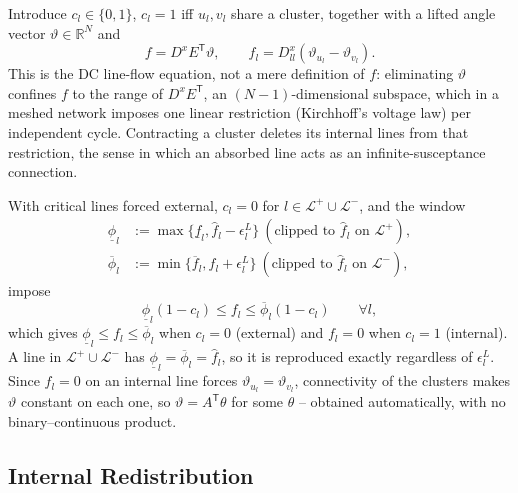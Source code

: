 \documentclass[journal]{IEEEtran}
\newcommand{\R}{\mathbb{R}}
\begin{document}
Introduce $c_l\in\{0,1\}$, $c_l=1$ iff $u_l,v_l$ share a cluster, together with a lifted angle vector $\vartheta\in\R^N$ and
\begin{equation}
 f=D^xE^{\mathsf T}\vartheta,
 \qquad
 f_l=D^x_{ll}(\vartheta_{u_l}-\vartheta_{v_l}).
 \label{eq:physical_flow}
\end{equation}
This is the DC line-flow equation, not a mere definition of $f$: eliminating $\vartheta$ confines $f$ to the range of $D^xE^{\mathsf T}$, an $(N-1)$-dimensional subspace, which in a meshed network imposes one linear restriction (Kirchhoff's voltage law) per independent cycle. Contracting a cluster deletes its internal lines from that restriction, the sense in which an absorbed line acts as an infinite-susceptance connection.

With critical lines forced external, $c_l=0$ for $l\in\mathcal L^+\cup\mathcal L^-$, and the window
\begin{align}
 \underline\phi_l&:=\max\{\underline f_l,\hat f_l-\epsilon_l^L\}\ (\text{clipped to }\hat f_l\text{ on }\mathcal L^+),\\
 \overline\phi_l&:=\min\{\overline f_l,\hat f_l+\epsilon_l^L\}\ (\text{clipped to }\hat f_l\text{ on }\mathcal L^-),
 \label{eq:phi}
\end{align}
impose
\begin{equation}
 \underline\phi_l(1-c_l)\le f_l\le\overline\phi_l(1-c_l)
 \qquad \forall l,
 \label{eq:f_onoff}
\end{equation}
which gives $\underline\phi_l\le f_l\le\overline\phi_l$ when $c_l=0$ (external) and $f_l=0$ when $c_l=1$ (internal). A line in $\mathcal L^+\cup\mathcal L^-$ has $\underline\phi_l=\overline\phi_l=\hat f_l$, so it is reproduced exactly regardless of $\epsilon_l^L$. Since $f_l=0$ on an internal line forces $\vartheta_{u_l}=\vartheta_{v_l}$, connectivity of the clusters makes $\vartheta$ constant on each one, so $\vartheta=A^{\mathsf T}\theta$ for some $\theta$ -- obtained automatically, with no binary--continuous product.

\subsection{Internal Redistribution}
\end{document}

